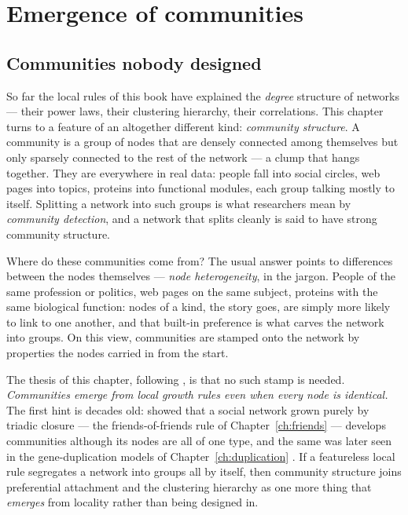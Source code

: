 \chapter{Emergence of communities}
\label{ch:communities}

\section{Communities nobody designed}

So far the local rules of this book have explained the \emph{degree} structure of
networks --- their power laws, their clustering hierarchy, their correlations.
This chapter turns to a feature of an altogether different kind: \emph{community
structure}. A community is a group of nodes that are densely connected among
themselves but only sparsely connected to the rest of the network --- a clump
that hangs together. They are everywhere in real data: people fall into social
circles, web pages into topics, proteins into functional modules, each group
talking mostly to itself. Splitting a network into such groups is what
researchers mean by \emph{community detection}, and a network that splits cleanly
is said to have strong community structure.

Where do these communities come from? The usual answer points to differences
between the nodes themselves --- \emph{node heterogeneity}, in the jargon. People
of the same profession or politics, web pages on the same subject, proteins with
the same biological function: nodes of a kind, the story goes, are simply more
likely to link to one another, and that built-in preference is what carves the
network into groups. On this view, communities are stamped onto the network by
properties the nodes carried in from the start.

The thesis of this chapter, following \citet{vazquezcommunities2025}, is that no
such stamp is needed. \emph{Communities emerge from local growth rules even when
every node is identical.} The first hint is decades old: \citet{jin2001} showed
that a social network grown purely by triadic closure --- the friends-of-friends
rule of Chapter~\ref{ch:friends} --- develops communities although its nodes are
all of one type, and the same was later seen in the gene-duplication models of
Chapter~\ref{ch:duplication} \citep{sole2002}. If a featureless local rule
segregates a network into groups all by itself, then community structure joins
preferential attachment and the clustering hierarchy as one more thing that
\emph{emerges} from locality rather than being designed in.


